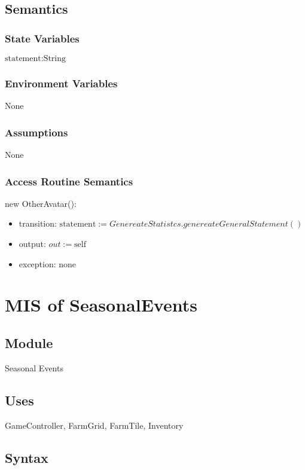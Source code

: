 \documentclass[12pt, titlepage]{article}
\begin{document}
\subsection{Semantics}

\subsubsection{State Variables}
$\text{statement}: \text{String}$\\
\subsubsection{Environment Variables}
None

\subsubsection{Assumptions}
None

\subsubsection{Access Routine Semantics}

\noindent new OtherAvatar():
\begin{itemize}
\item transition: $\text{statement}:= GenereateStatistcs.genereateGeneralStatement()$
\item output: $out := \mbox{self}$
\item exception: none
\end{itemize}


\section{MIS of SeasonalEvents} 


\subsection{Module}
Seasonal Events

\subsection{Uses}
GameController, FarmGrid, FarmTile, Inventory


\subsection{Syntax}
\end{document}
